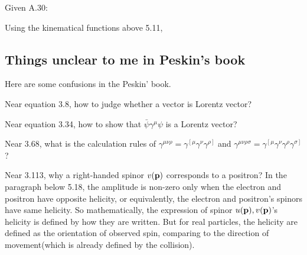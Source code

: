 Given A.30:



Using the kinematical functions above 5.11,


\subsection{Things unclear to me in Peskin's book}

Here are some confusions in the Peskin' book. 

Near equation 3.8, how to judge whether a vector is Lorentz vector? 

Near equation 3.34, how to show that $\bar{\psi}\gamma^\mu\psi$ is a Lorentz vector? 

Near 3.68, what is the calculation rules of $\gamma^{\mu\nu\rho}=\gamma^{\left[\mu\right.}\gamma^\nu\gamma^{\left.\rho\right]}$ and $\gamma^{\mu\nu\rho\sigma}=\gamma^{\left[\mu\right.}\gamma^\nu\gamma^\rho\gamma^{\left.\sigma\right]}$?

Near 3.113, why a right-handed spinor $v(\bf{p})$ corresponds to a positron?
In the paragraph below 5.18, the amplitude is non-zero only when the electron and positron have opposite helicity,
or equivalently, the electron and positron's spinors have same helicity.
So mathematically, the expression of spinor $u(\bf{p}),v(\bf{p})$'s helicity is defined by how they are written.
But for real particles, the helicity are defined as the orientation of observed spin, comparing to the direction of movement(which is already defined by the collision).

